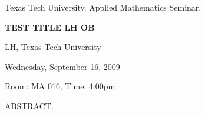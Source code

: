 \documentclass[oneside]{amsart}
\newcommand{\talktitle}{\uppercase{test title Lh Ob}}
\newcommand{\talkspeaker}{LH, Texas Tech University}
\newcommand{\talkdate}{Wednesday, September 16, 2009}
\newcommand{\talkabstract}{

}
\begin{document}
\thispagestyle{empty}

\begin{center}
Texas Tech University.  Applied Mathematics Seminar.

\end{center}

\begin{center}

\textbf{\LARGE \talktitle}

\talkspeaker

\talkdate

Room: MA 016, Time: 4:00pm

\end{center}

ABSTRACT.
\talkabstract
\end{document}
